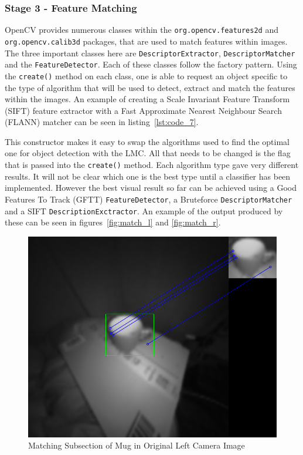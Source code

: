 \documentclass[11pt,oneside]{report}
\newcommand\code[1]{\texttt{#1}}
\begin{document}
		\subsubsection{Stage 3 - Feature Matching}
			OpenCV provides numerous classes within the \code{org.opencv.features2d} and \code{org.opencv.calib3d} packages, that are used to match features within images.
			The three important classes here are \code{DescriptorExtractor}, \code{DescriptorMatcher} and the \code{FeatureDetector}.
			Each of these classes follow the factory pattern.
			Using the \code{create()} method on each class, one is able to request an object specific to the type of algorithm that will be used to detect, extract and match the features within the images.
			An example of creating a Scale Invariant Feature Transform (SIFT) feature extractor with a Fast Approximate Nearest Neighbour Search (FLANN) matcher can be seen in listing~\ref{lst:code_7}.
			
			This constructor makes it easy to swap the algorithms used to find the optimal one for object detection with the LMC.
			All that needs to be changed is the flag that is passed into the \code{create()} method.
			Each algorithm type gave very different results.
			It will not be clear which one is the best type until a classifier has been implemented.
			However the best visual result so far can be achieved using a Good Features To Track (GFTT) \code{FeatureDetector}, a Bruteforce \code{DescriptorMatcher} and a SIFT \code{DescriptionExctractor}.
			An example of the output produced by these can be seen in figures~\ref{fig:match_l} and \ref{fig:match_r}.
			\begin{figure}
			\centering
    				\includegraphics[width=\textwidth]{match_l}
    			\caption{Matching Subsection of Mug in Original Left Camera Image \protect {\label{fig:match_l}}}

			\end{figure}	
\end{document}
